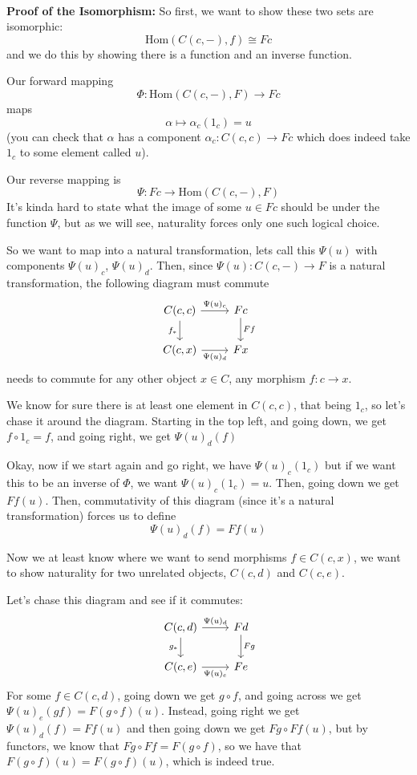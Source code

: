 \documentclass{article}
\begin{document}
\begin{customproof}
\

\textbf{Proof of the Isomorphism:} So first, we want to show these two sets are isomorphic: $$\text{Hom}(C(c,-), f) \cong Fc$$and we do this by showing there is a function and an inverse function.

Our forward mapping $$\Phi: \text{Hom}(C(c,-), F) \to Fc$$maps $$\alpha \mapsto \alpha_c(1_c) = u$$(you can check that $\alpha$ has a component $\alpha_c: C(c,c) \to Fc$ which does indeed take $1_c$ to some element called $u$).

Our reverse mapping is $$\Psi: Fc \to \text{Hom}(C(c, -), F)$$It's kinda hard to state what the image of some $u \in Fc$ should be under the function $\Psi$, but as we will see, naturality forces only one such logical choice. 

So we want to map into a natural transformation, lets call this $\Psi(u)$ with components $\Psi(u)_c$, $\Psi(u)_d$. Then, since $\Psi(u): C(c,-) \to F$ is a natural transformation, the following diagram must commute \[\begin{tikzcd}
	C(c,c) & Fc\\
	C(c,x) & Fx
	\arrow[from=1-1, to=1-2, "\Psi(u)_c"]
	\arrow[from=1-1, to=2-1, "f_*"']
	\arrow[from=1-2, to=2-2, "Ff"]
	\arrow[from=2-1, to=2-2, "\Psi(u)_d"']
\end{tikzcd}\]needs to commute for any other object $x \in C$, any morphism $f: c \to x$.

We know for sure there is at least one element in $C(c,c)$, that being $1_c$, so let's chase it around the diagram. Starting in the top left, and going down, we get $f \circ 1_c = f$, and going right, we get $\Psi(u)_d(f)$

Okay, now if we start again and go right, we have $\Psi(u)_c(1_c)$ but if we want this to be an inverse of $\Phi$, we want $\Psi(u)_c(1_c) = u$. Then, going down we get $Ff(u)$. Then, commutativity of this diagram (since it's a natural transformation) forces us to define $$\Psi(u)_d(f) = Ff(u)$$

Now we at least know where we want to send morphisms $f \in C(c,x)$, we want to show naturality for two unrelated objects, $C(c,d)$ and $C(c,e)$. 

Let's chase this diagram and see if it commutes: \[\begin{tikzcd}
	C(c,d) & Fd\\
	C(c,e) & Fe
	\arrow[from=1-1, to=1-2, "\Psi(u)_d"]
	\arrow[from=1-1, to=2-1, "g_*"']
	\arrow[from=2-1, to=2-2, "\Psi(u)_e"']
	\arrow[from=1-2, to=2-2, "Fg"]
\end{tikzcd}\]For some $f \in C(c,d)$, going down we get $g\circ f$, and going across we get $\Psi(u)_e(gf) = F(g\circ f)(u)$. Instead, going right we get $\Psi(u)_d(f) = Ff(u)$ and then going down we get $Fg \circ Ff(u)$, but by functors, we know that $Fg \circ Ff = F(g \circ f)$, so we have that $F(g \circ f)(u) = F(g \circ f)(u)$, which is indeed true.


\end{customproof}
\end{document}
